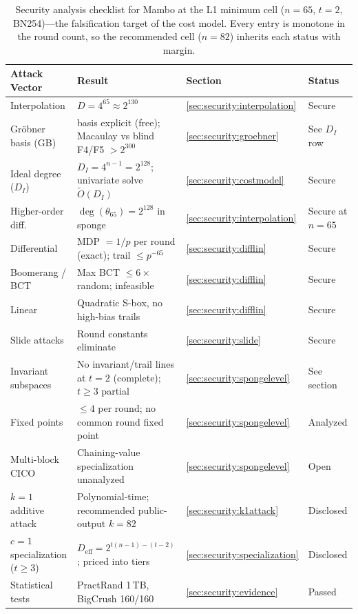 \documentclass[11pt,a4paper]{article}
\theoremstyle{definition}
\begin{document}
\begin{table}[H]
\centering
\caption{Security analysis checklist for Mambo at the L1 minimum cell
($n=65$, $t=2$, BN254)---the falsification target of the cost model.
Every entry is monotone in the round count, so the recommended cell
($n=82$) inherits each status with margin.}
\label{tab:security_checklist}
\footnotesize
\begin{tabular}{@{}llll@{}}
\toprule
Attack Vector & Result & Section & Status \\
\midrule
Interpolation          & $D = 4^{65} \approx 2^{130}$ & \ref{sec:security:interpolation} & Secure \\
Gr\"obner basis (GB)   & basis explicit (free); Macaulay vs blind F4/F5 $> 2^{300}$ & \ref{sec:security:groebner} & See $D_I$ row \\
Ideal degree ($D_I$)   & $D_I = 4^{n-1} = 2^{128}$; univariate solve $\widetilde{O}(D_I)$ & \ref{sec:security:costmodel} & Secure \\
Higher-order diff.     & $\deg(\theta_{65}) = 2^{128}$ in sponge & \ref{sec:security:interpolation} & Secure at $n=65$ \\
Differential           & MDP $= 1/p$ per round (exact); trail $\le p^{-65}$ & \ref{sec:security:difflin} & Secure \\
Boomerang / BCT        & Max BCT $\le 6\times$ random; infeasible & \ref{sec:security:difflin} & Secure \\
Linear                 & Quadratic S-box, no high-bias trails & \ref{sec:security:difflin} & Secure \\
Slide attacks          & Round constants eliminate & \ref{sec:security:slide} & Secure \\
Invariant subspaces    & No invariant/trail lines at $t=2$ (complete); $t \ge 3$ partial & \ref{sec:security:spongelevel} & See section \\
Fixed points           & $\le 4$ per round; no common round fixed point & \ref{sec:security:spongelevel} & Analyzed \\
Multi-block CICO       & Chaining-value specialization unanalyzed & \ref{sec:security:spongelevel} & Open \\
$k=1$ additive attack  & Polynomial-time; recommended public-output $k = 82$ & \ref{sec:security:k1attack} & Disclosed \\
$c=1$ specialization ($t \ge 3$) & $D_{\mathrm{eff}} = 2^{t(n-1)-(t-2)}$; priced into tiers & \ref{sec:security:specialization} & Disclosed \\
Statistical tests      & PractRand 1\,TB, BigCrush 160/160 & \ref{sec:security:evidence} & Passed \\
\bottomrule
\end{tabular}
\end{table}
\end{document}
